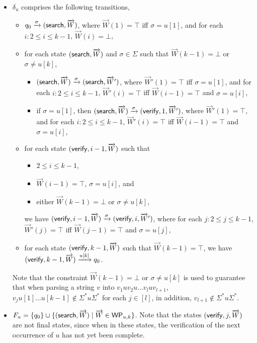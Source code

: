 \begin{itemize}
	\item $\delta_{u}$ comprises the following transitions,
	\begin{itemize}
		\item $q_0 \xrightarrow{\sigma} (\mathsf{search}, \overrightarrow{W})$, where $\overrightarrow{W}(1)=\top$ iff $\sigma = u[1]$, and for each $i: 2 \le i \le k-1$, $\overrightarrow{W}(i) = \bot$,
		\item for each state $(\mathsf{search}, \overrightarrow{W})$ and $\sigma \in \Sigma$ such that $\overrightarrow{W}(k-1) = \bot$ or $\sigma \neq u[k]$,
		\begin{itemize}
			\item $(\mathsf{search}, \overrightarrow{W}) \xrightarrow{\sigma} (\mathsf{search}, \overrightarrow{W}')$, where $\vec{W}'(1) = \top$ iff $\sigma = u[1]$, and for each $i: 2 \le i \le k-1$, $\vec{W}'(i) =\top$ iff $\overrightarrow{W}({i-1}) = \top$ and $\sigma = u[i]$,
			\item if $\sigma = u[1]$, then $(\mathsf{search}, \overrightarrow{W}) \xrightarrow{\sigma} (\mathsf{verify}, 1, \overrightarrow{W}')$,  where $\overrightarrow{W}'(1)=\top$,  and for each $i: 2 \le i \le k-1$, $\overrightarrow{W}'(i) =\top$ iff $\overrightarrow{W}({i-1}) = \top$ and $\sigma = u[i]$,
		\end{itemize}
		\item for each state $(\mathsf{verify}, i-1, \overrightarrow{W})$ such that
		\begin{itemize}
			\item $2 \le i \le k-1$,
			\item $\overrightarrow{W}(i-1)=\top$, $\sigma = u[i]$, and
			\item either $\overrightarrow{W}(k-1)=\bot$ or $\sigma \neq u[k]$, 
		\end{itemize}
		we have $(\mathsf{verify}, i-1, \overrightarrow{W}) \xrightarrow{\sigma} (\mathsf{verify}, i, \overrightarrow{W}')$, where for each $j: 2 \le j \le k-1$, $\overrightarrow{W}'(j) = \top$ iff $\overrightarrow{W}(j-1)=\top$ and $\sigma = u[j]$, 
		\item for each state $(\mathsf{verify}, k-1, \overrightarrow{W})$ such that $\overrightarrow{W}(k-1)=\top$, we have $(\mathsf{verify}, k-1, \overrightarrow{W}) \xrightarrow{u[k]} q_0$.
	\end{itemize}
	Note that the constraint $\vec{W}(k-1) = \bot$ or $\sigma \neq u[k]$ is used to guarantee that when parsing a string $v$ into $v_1 u v_2 u \dots v_{l} u v_{l+1}$, $v_j u[1] \dots u[k-1] \not \in \Sigma^\ast u \Sigma^\ast$ for each $j \in [l]$, in addition, $v_{l+1} \not \in  \Sigma^\ast u \Sigma^\ast$.
	\item $F_u=\{q_0\} \cup \{(\mathsf{search}, \overrightarrow{W}) \mid \overrightarrow{W} \in \mathsf{WP}_{u, k} \} $. Note that the states $(\mathsf{verify}, j, \overrightarrow{W})$ are not final states, since when in these states, the verification of the next occurrence of $u$ has not yet been complete.
\end{itemize}
